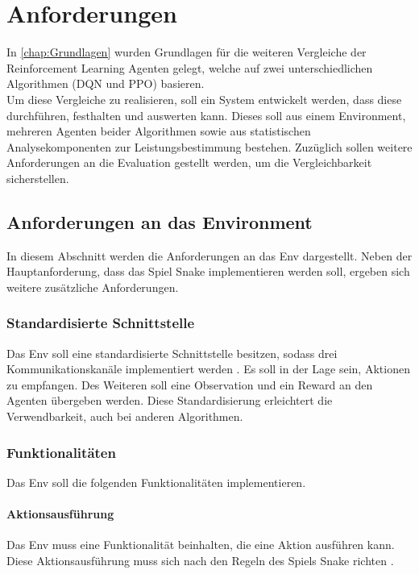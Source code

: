 \chapter{Anforderungen} \label{chap:Anforderungen}
In \autoref{chap:Grundlagen} wurden Grundlagen für die weiteren Vergleiche der Reinforcement Learning Agenten gelegt, welche auf zwei unterschiedlichen Algorithmen (DQN und PPO) basieren.\\
Um diese Vergleiche zu realisieren, soll ein System entwickelt werden, dass diese durchführen, festhalten und auswerten kann. Dieses soll aus einem Environment, mehreren Agenten beider Algorithmen sowie aus statistischen Analysekomponenten zur Leistungsbestimmung bestehen. Zuzüglich sollen weitere Anforderungen an die Evaluation gestellt werden, um die Vergleichbarkeit sicherstellen.

\section{Anforderungen an das Environment} \label{sec:Anforderungen_Env}
In diesem Abschnitt werden die Anforderungen an das Env dargestellt. Neben der Hauptanforderung, dass das Spiel Snake implementieren werden soll, ergeben sich weitere zusätzliche Anforderungen.

\subsection{Standardisierte Schnittstelle} \label{subsec:Anforderungen_Schnittstelle}
Das Env soll eine standardisierte Schnittstelle besitzen, sodass drei Kommunikationskanäle implementiert werden . Es soll in der Lage sein, Aktionen zu empfangen. Des Weiteren soll eine Observation und ein Reward an den Agenten übergeben werden. Diese Standardisierung erleichtert die Verwendbarkeit, auch bei anderen Algorithmen.

\subsection{Funktionalitäten} \label{subsec:Anforderungen_Funktionalität_Env}
Das Env soll die folgenden Funktionalitäten implementieren.

\subsubsection{Aktionsausführung} \label{subsubsec:Anforderungen_Aktionsausführung}
Das Env muss eine Funktionalität beinhalten, die eine Aktion ausführen kann. Diese Aktionsausführung muss sich nach den Regeln des Spiels Snake richten .


